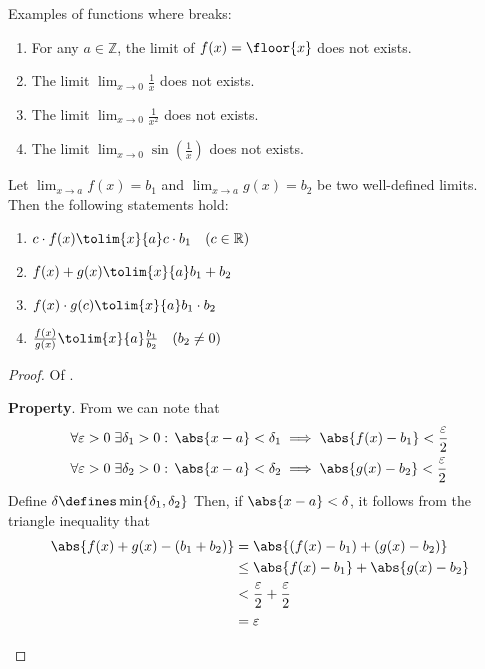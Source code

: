 \begin{rem}\label{rem-undefined-limits}
    Examples of functions where  breaks:
    \begin{enumerate}
        \item For any $a\in\mathbb{Z}$, the limit of $f(x)=\floor{x}$ does not exists.
        \item The limit $\displaystyle\lim_{x\to0}\tfrac{1}{x}$ does not exists.
        \item The limit $\displaystyle\lim_{x\to0}\tfrac{1}{x^2}$ does not exists.
        \item The limit $\displaystyle\lim_{x\to0}\sin\left(\tfrac{1}{x}\right)$ does not exists.
    \end{enumerate}
\end{rem}

\begin{thm}\label{thm-limit-arithmetic}
    Let $\displaystyle\lim_{x \to a}f(x) = b_1$ and $\displaystyle\lim_{x \to a}g(x) = b_2$
    be two well-defined limits. Then the following statements hold:
    \begin{enumerate}
        \item $c \cdot f(x) \tolim{x}{a} c \cdot b_1 \quad (c\in\mathbb{R})$
        \item $f(x) + g(x) \tolim{x}{a} b_1 + b_2$
        \item $f(x) \cdot g(c) \tolim{x}{a} b_1 \cdot b_2$
        \item $\tfrac{f(x)}{g(x)} \tolim{x}{a} \tfrac{b_1}{b_2} \quad (b_2 \neq 0)$
    \end{enumerate}
\end{thm}


\begin{proof}
    Of .
    \begin{flushleft}
        \textbf{ Property}. From 
        we can note that
        \begin{align*}
            &\forall\varepsilon>0\;\exists\delta_1>0:\,\abs{x-a}<\delta_1\implies\abs{f(x)-b_1}<\frac{\varepsilon}{2}\\
            &\forall\varepsilon>0\;\exists\delta_2>0:\,\abs{x-a}<\delta_2\implies\abs{g(x)-b_2}<\frac{\varepsilon}{2}
        \end{align*}        
        Define $\delta\defines\min\{\delta_1,\delta_2\}$ Then, if $\abs{x-a}<\delta$,
        it follows from the triangle inequality that
        \begin{align*}
            \abs{f(x)+g(x)-(b_1+b_2)}&=\abs{(f(x)-b_1)+(g(x)-b_2)}\\
                                     &\leq\abs{f(x)-b_1}+\abs{g(x)-b_2}\\
                                     &<\frac{\varepsilon}{2}+\frac{\varepsilon}{2}\\
                                     &=\varepsilon
        \end{align*}
    \end{flushleft}
\end{proof}

